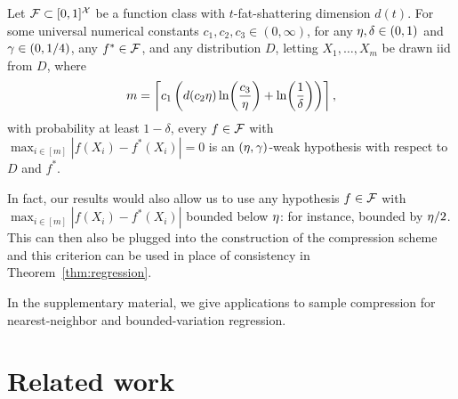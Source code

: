 \begin{theorem}
  \label{thm:gen-weak-learn}
  Let $\mathcal{F}\subset[0,1]^{\mathcal{X}}$ be a
  function class
  with $t$-fat-shattering dimension $d(t)$.
For some universal numerical constants $c_{1},c_{2},c_{3} \in (0,\infty)$, 
for any $\eta,\delta \in (0,1)$ and $\gamma \in (0,1/4)$,
any $f^*\in\mathcal{F}$,
and any distribution $D$,
letting $X_{1},\ldots,X_{m}$ be drawn iid from $D$, where 
\begin{equation*}
  m = \left\lceil c_{1} \left(  d(c_{2} \eta ) \ln\!\left( \frac{c_{3}}{\eta} \right) + \ln\!\left(\frac{1}{\delta}\right) \right) \right\rceil,
\end{equation*}
with probability at least $1-\delta$, every $f \in \mathcal{F}$ with
$
\max_{i\in[m]}
|f(X_{i}) - f^{*}(X_{i})| = 0$
is an $(\eta,\gamma)$-weak hypothesis
with respect to $D$ and $f^*$.
\end{theorem}

In fact, our results would also allow us to use any hypothesis $f \in \mathcal{F}$ with 
$\max_{i \in [m]} |f(X_{i}) - f^{*}(X_{i})|$ bounded below $\eta$: for instance, 
bounded by $\eta / 2$.  This can then also be plugged into the construction of the 
compression scheme and this criterion can be used in place of consistency in Theorem~\ref{thm:regression}.


In the
supplementary material,
we give applications to sample compression
for nearest-neighbor
and
bounded-variation regression.


    


\section{Related work}

\label{sec:rel-work}

